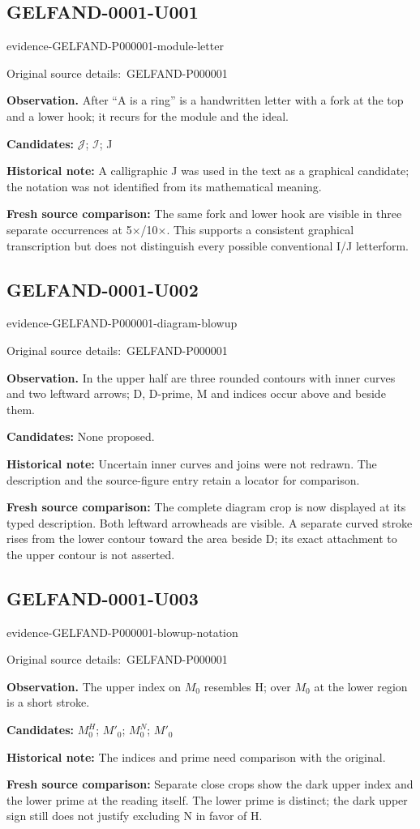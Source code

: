 \documentclass[11pt]{article}
\newcommand{\EvidenceBlock}[4]{%
 \par\smallskip\noindent\begin{minipage}{\linewidth}
 \begin{minipage}[t]{.47\linewidth}\vspace{0pt}\centering
 \csname evidence-#1-#2\endcsname\par
 {\scriptsize\SourceCropCaption\ #1}\par
 \end{minipage}\hfill
 \begin{minipage}[t]{.49\linewidth}\vspace{0pt}\raggedright
 {\small\color{orange!65!black}\textbf{#4} #3}\par
 \end{minipage}
 \end{minipage}\par\smallskip}
\newcommand{\SourceCropCaption}{Original source details:}\newcommand{\ReadingCaption}{Uncertain reading.}\newcommand{\IncompleteCaption}{Undeciphered passage.}\newcommand{\DiagramCaption}{Diagram and typed description.}
\begin{document}
\subsection*{GELFAND-0001-U001}
\EvidenceBlock{GELFAND-P000001}{module-letter}{After “A is a ring” is a handwritten letter with a fork at the top and a lower hook; it recurs for the module and the ideal.}{Observation.}
\par\smallskip\noindent\textbf{Candidates: } \(\mathcal{J}\); \(\mathcal{I}\); J\par
\par\smallskip\noindent\textbf{Historical note: } A calligraphic J was used in the text as a graphical candidate; the notation was not identified from its mathematical meaning.\par
\par\smallskip\noindent\textbf{Fresh source comparison: } The same fork and lower hook are visible in three separate occurrences at 5×/10×. This supports a consistent graphical transcription but does not distinguish every possible conventional I/J letterform.\par
\subsection*{GELFAND-0001-U002}
\EvidenceBlock{GELFAND-P000001}{diagram-blowup}{In the upper half are three rounded contours with inner curves and two leftward arrows; D, D-prime, M and indices occur above and beside them.}{Observation.}
\par\smallskip\noindent\textbf{Candidates: } None proposed.\par
\par\smallskip\noindent\textbf{Historical note: } Uncertain inner curves and joins were not redrawn. The description and the source-figure entry retain a locator for comparison.\par
\par\smallskip\noindent\textbf{Fresh source comparison: } The complete diagram crop is now displayed at its typed description. Both leftward arrowheads are visible. A separate curved stroke rises from the lower contour toward the area beside D; its exact attachment to the upper contour is not asserted.\par
\subsection*{GELFAND-0001-U003}
\EvidenceBlock{GELFAND-P000001}{blowup-notation}{The upper index on \(M_0\) resembles H; over \(M_0\) at the lower region is a short stroke.}{Observation.}
\par\smallskip\noindent\textbf{Candidates: } \(M_0^H\); \(M'_0\); \(M_0^N\); \(M'_0\)\par
\par\smallskip\noindent\textbf{Historical note: } The indices and prime need comparison with the original.\par
\par\smallskip\noindent\textbf{Fresh source comparison: } Separate close crops show the dark upper index and the lower prime at the reading itself. The lower prime is distinct; the dark upper sign still does not justify excluding N in favor of H.\par
\end{document}
